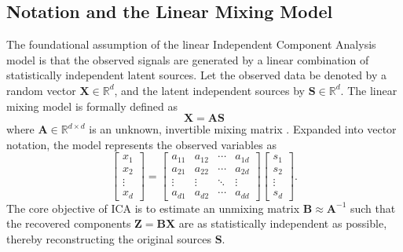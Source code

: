 \documentclass[12pt,a4paper,twoside,openany]{book}
\begin{document}
\subsection{Notation and the Linear Mixing Model}
The foundational assumption of the linear Independent Component Analysis model is that the observed signals are generated by a linear combination of statistically independent latent sources. 
Let the observed data be denoted by a random vector $\mathbf{X} \in \mathbb{R}^d$, and the latent independent sources by $\mathbf{S} \in \mathbb{R}^d$. 
The linear mixing model is formally defined as
\begin{equation}
    \mathbf{X} = \mathbf{A} \mathbf{S}
\end{equation}
where $\mathbf{A} \in \mathbb{R}^{d \times d}$ is an unknown, invertible mixing matrix \cite[Chapter7]{hyvarinen2001}. Expanded into vector notation, the model represents the observed variables as
\begin{equation}
    \begin{bmatrix}
    x_1 \\
    x_2 \\
    \vdots \\
    x_d
    \end{bmatrix}
    = 
    \begin{bmatrix}
    a_{11} & a_{12} & \cdots & a_{1d} \\
    a_{21} & a_{22} & \cdots & a_{2d} \\
    \vdots & \vdots & \ddots & \vdots \\
    a_{d1} & a_{d2} & \cdots & a_{dd}
    \end{bmatrix}
    \begin{bmatrix}
    s_1 \\
    s_2 \\
    \vdots \\
    s_d
    \end{bmatrix}.
\end{equation}
The core objective of ICA is to estimate an unmixing matrix $\mathbf{B} \approx \mathbf{A}^{-1}$ such that the recovered components $\mathbf{Z} = \mathbf{B}\mathbf{X}$ are as 
statistically independent as possible, thereby reconstructing the original sources $\mathbf{S}$.
\end{document}
